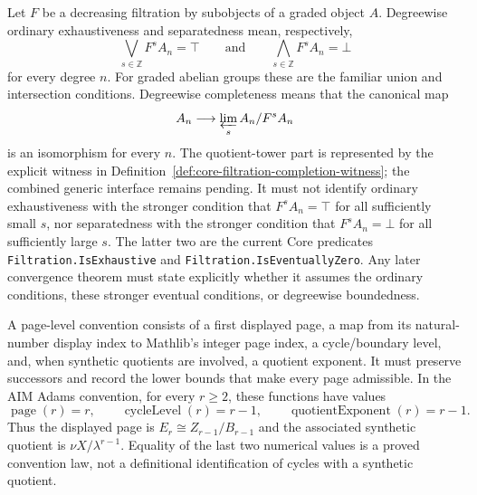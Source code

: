 \begin{definition}
  \label{def:complete-separated-filtration}
  \notready
  Let $F$ be a decreasing filtration by subobjects of a graded object $A$.
  Degreewise ordinary exhaustiveness and separatedness mean, respectively,
  \[
    \bigvee_{s\in\mathbb Z}F^sA_n=\top
    \qquad\text{and}\qquad
    \bigwedge_{s\in\mathbb Z}F^sA_n=\bot
  \]
  for every degree $n$.  For graded abelian groups these are the familiar
  union and intersection conditions.  Degreewise completeness means that the
  canonical map
  \[
    A_n\longrightarrow\varprojlim_s A_n/F^sA_n
  \]
  is an isomorphism for every $n$.  The quotient-tower part is represented by
  the explicit witness in
  Definition~\ref{def:core-filtration-completion-witness}; the combined
  generic interface remains pending.  It must not identify ordinary
  exhaustiveness with the stronger condition that $F^sA_n=\top$ for all
  sufficiently small $s$, nor separatedness with the stronger condition that
  $F^sA_n=\bot$ for all sufficiently large $s$.  The latter two are the
  current Core predicates \texttt{Filtration.IsExhaustive} and
  \texttt{Filtration.IsEventuallyZero}.  Any later convergence theorem must
  state explicitly whether it assumes the ordinary conditions, these stronger
  eventual conditions, or degreewise boundedness.
\end{definition}

\begin{definition}
  \label{def:ss-page-level}
  \notready
  A page-level convention consists of a first displayed page, a map from its
  natural-number display index to Mathlib's integer page index, a
  cycle/boundary level, and, when synthetic quotients are involved, a quotient
  exponent.  It must preserve successors and record the lower bounds that make
  every page admissible.  In the AIM Adams convention, for every $r\ge2$,
  these functions have values
  \[
    \operatorname{page}(r)=r,\qquad
    \operatorname{cycleLevel}(r)=r-1,\qquad
    \operatorname{quotientExponent}(r)=r-1.
  \]
  Thus the displayed page is $E_r\cong Z_{r-1}/B_{r-1}$ and the associated
  synthetic quotient is $\nu X/\lambda^{r-1}$.  Equality of the last two
  numerical values is a proved convention law, not a definitional
  identification of cycles with a synthetic quotient.
\end{definition}

